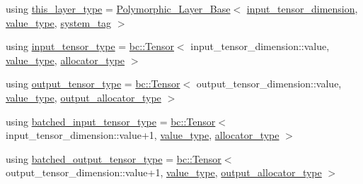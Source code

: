 \begin{DoxyCompactItemize}
\item 
using \hyperlink{structbc_1_1nn_1_1Polymorphic__Layer__Base_a6087076d2e0a31e6bbdc2c2039c3ab52}{this\+\_\+layer\+\_\+type} = \hyperlink{structbc_1_1nn_1_1Polymorphic__Layer__Base}{Polymorphic\+\_\+\+Layer\+\_\+\+Base}$<$ \hyperlink{structbc_1_1nn_1_1Polymorphic__Layer__Base_a9cf367e8f043b3bc7ac8ce8f5aeaa832}{input\+\_\+tensor\+\_\+dimension}, \hyperlink{structbc_1_1nn_1_1Polymorphic__Layer__Base_aa7d46845ee0a4544003a6f8fe3b7f52a}{value\+\_\+type}, \hyperlink{structbc_1_1nn_1_1Polymorphic__Layer__Base_a038901ff126b59392a45ffb2d839b3b0}{system\+\_\+tag} $>$
\item 
using \hyperlink{structbc_1_1nn_1_1Polymorphic__Layer__Base_accd9d828714e1abe620fa89aa1556757}{input\+\_\+tensor\+\_\+type} = \hyperlink{namespacebc_a659391e47ab612be3ba6c18cf9c89159}{bc\+::\+Tensor}$<$ input\+\_\+tensor\+\_\+dimension\+::value, \hyperlink{structbc_1_1nn_1_1Polymorphic__Layer__Base_aa7d46845ee0a4544003a6f8fe3b7f52a}{value\+\_\+type}, \hyperlink{structbc_1_1nn_1_1Polymorphic__Layer__Base_a1414f8c37dea6254aebf63e4486ed818}{allocator\+\_\+type} $>$
\item 
using \hyperlink{structbc_1_1nn_1_1Polymorphic__Layer__Base_aaa3bdb6355a104df7c68d46fd4ffa15a}{output\+\_\+tensor\+\_\+type} = \hyperlink{namespacebc_a659391e47ab612be3ba6c18cf9c89159}{bc\+::\+Tensor}$<$ output\+\_\+tensor\+\_\+dimension\+::value, \hyperlink{structbc_1_1nn_1_1Polymorphic__Layer__Base_aa7d46845ee0a4544003a6f8fe3b7f52a}{value\+\_\+type}, \hyperlink{structbc_1_1nn_1_1Polymorphic__Layer__Base_a4bc904c1787b9da18e35d0c6b60ac59f}{output\+\_\+allocator\+\_\+type} $>$
\item 
using \hyperlink{structbc_1_1nn_1_1Polymorphic__Layer__Base_ae694b03dd73923ff973b0d2c9156e161}{batched\+\_\+input\+\_\+tensor\+\_\+type} = \hyperlink{namespacebc_a659391e47ab612be3ba6c18cf9c89159}{bc\+::\+Tensor}$<$ input\+\_\+tensor\+\_\+dimension\+::value+1, \hyperlink{structbc_1_1nn_1_1Polymorphic__Layer__Base_aa7d46845ee0a4544003a6f8fe3b7f52a}{value\+\_\+type}, \hyperlink{structbc_1_1nn_1_1Polymorphic__Layer__Base_a1414f8c37dea6254aebf63e4486ed818}{allocator\+\_\+type} $>$
\item 
using \hyperlink{structbc_1_1nn_1_1Polymorphic__Layer__Base_a45ed57549be9c4e5c40c52168ca15ae9}{batched\+\_\+output\+\_\+tensor\+\_\+type} = \hyperlink{namespacebc_a659391e47ab612be3ba6c18cf9c89159}{bc\+::\+Tensor}$<$ output\+\_\+tensor\+\_\+dimension\+::value+1, \hyperlink{structbc_1_1nn_1_1Polymorphic__Layer__Base_aa7d46845ee0a4544003a6f8fe3b7f52a}{value\+\_\+type}, \hyperlink{structbc_1_1nn_1_1Polymorphic__Layer__Base_a4bc904c1787b9da18e35d0c6b60ac59f}{output\+\_\+allocator\+\_\+type} $>$

\end{DoxyCompactItemize}
